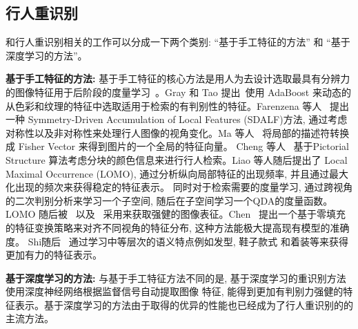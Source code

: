 \subsection{行人重识别}
和行人重识别相关的工作可以分成一下两个类别: ``基于手工特征的方法'' 和 ``基于深度学习的方法''。 \par
\textbf{基于手工特征的方法:} 
基于手工特征的核心方法是用人为去设计选取最具有分辨力的图像特征用于后阶段的度量学习~\cite{gray2008viewpoint, hu2013exploring, gheissari2006person, farenzena2010person, ma2012local, cheng2011custom}。Gray 和 Tao 提出~\cite{gray2008viewpoint}使用 AdaBoost 来动态的从色彩和纹理的特征中选取适用于检索的有判别性的特征。Farenzena 等人~\cite{farenzena2010person} 提出一种 Symmetry-Driven Accumulation of Local Features (SDALF)方法, 通过考虑对称性以及非对称性来处理行人图像的视角变化。Ma 等人~\cite{ma2012local} 将局部的描述符转换成 Fisher
Vector 来得到图片的一个全局的特征向量。 Cheng 等人~\cite{cheng2011custom} 基于Pictorial Structure 算法考虑分块的颜色信息来进行行人检索。Liao 等人随后提出了 Local Maximal Occurrence (LOMO), 通过分析纵向局部特征的出现频率, 并且通过最大化出现的频次来获得稳定的特征表示。 同时对于检索需要的度量学习, 通过跨视角的二次判别分析来学习一个子空间, 随后在子空间学习一个QDA的度量函数。LOMO 随后被~\cite{zhang2016learning} 以及~\cite{zhang2016sample} 采用来获取强健的图像表征。Chen~\cite{chen2015mirror} 提出一个基于零填充的特征变换策略来对齐不同视角的特征分布, 这种方法能极大提高现有模型的准确度。 Shi随后~\cite{shi2015transferring} 通过学习中等层次的语义特点例如发型, 鞋子款式 和着装等来获得更加有力的特征表示。 \par
\textbf{基于深度学习的方法:}
与基于手工特征方法不同的是, 基于深度学习的重识别方法使用深度神经网络根据监督信号自动提取图像
特征, 能得到更加有判别力强健的特征表示。基于深度学习的方法由于取得的优异的性能也已经成为了行人重识别的的主流方法。 \par
